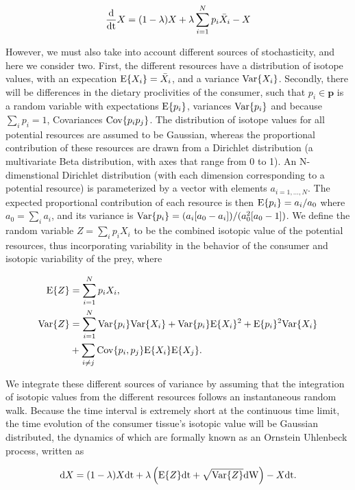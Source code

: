 \documentclass[11pt]{article}
\begin{document}
\begin{equation}
\frac{\rm d}{\rm dt}X = (1-\lambda)X + \lambda \sum_{i=1}^N p_i \bar{X}_i - X
\end{equation}

However, we must also take into account different sources of stochasticity, and here we consider two.
First, the different resources have a distribution of isotope values, with an expecation ${\rm E}\{X_i\}=\bar{X}_i$, and a variance ${\rm Var}\{X_i\}$.
Secondly, there will be differences in the dietary proclivities of the consumer, such that $p_i \in {\bm p}$ is a random variable with expectations ${\rm E}\{p_i\}$, variances ${\rm Var}\{p_i\}$ and because $\sum_i p_i = 1$, Covariances ${\rm Cov}\{p_i p_j\}$.
The distribution of isotope values for all potential resources are assumed to be Gaussian, whereas the proportional contribution of these resources are drawn from a Dirichlet distribution (a multivariate Beta distribution, with axes that range from 0 to 1).
An N-dimenstional Dirichlet distribution (with each dimension corresponding to a potential resource) is parameterized by a vector with elements $a_{i=1,...,N}$.
The expected proportional contribution of each resource is then ${\rm E}\{p_i\}=a_i/a_0$ where $a_0 = \sum_i a_i$, and its variance is ${\rm Var}\{p_i\} = (a_i[a_0 - a_i])/(a_0^2[a_0 - 1])$.
We define the random variable $Z = \sum_i p_i X_i$ to be the combined isotopic value of the potential resources, thus incorporating variability in the behavior of the consumer and isotopic variability of the prey, where

\begin{align}
{\rm E}\{Z\} &= \sum_{i=1}^N p_i X_i, \nonumber \\
{\rm Var}\{Z\} &= \sum_{i=1}^N {\rm Var}\{p_i\}{\rm Var}\{X_i\} + {\rm Var}\{p_i\}{\rm E}\{X_i\}^2 + {\rm E}\{p_i\}^2{\rm Var}\{X_i\} \\ \nonumber
&+ \sum_{i \neq j}{\rm Cov}\{p_i,p_j\}{\rm E}\{X_i\}{\rm E}\{X_j\}.
\end{align}

We integrate these different sources of variance by assuming that the integration of isotopic values from the different resources follows an instantaneous random walk.
Because the time interval is extremely short at the continuous time limit, the time evolution of the consumer tissue's isotopic value will be Gaussian distributed, the dynamics of which are formally known as an Ornstein Uhlenbeck process, written as

\begin{equation}
{\rm d}X = (1-\lambda)X{\rm dt} + \lambda\left({\rm E}\{Z\}{\rm dt} + \sqrt{{\rm Var}\{Z\}}{\rm dW}\right) - X{\rm dt}.
\end{equation}
\end{document}

